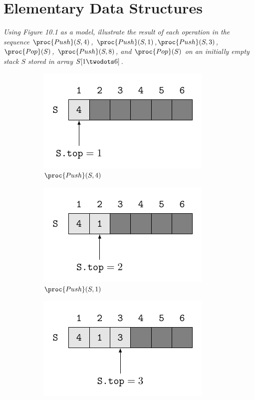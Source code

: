 \section{Elementary Data Structures}

\begin{description}

 \textit{Using Figure 10.1 as a model, illustrate the result of each operation in the sequence $\proc{Push}(S,4)$, $\proc{Push}(S,1)$,$\proc{Push}(S,3)$, $\proc{Pop}(S)$, $\proc{Push}(S,8)$, and $\proc{Pop}(S)$  on an initially empty stack $S$ stored in array $S[1 \twodots6]$.}
\begin{ex}
    \begin{figure}[H]
      \centering
      \begin{subfigure}[t]{.45\textwidth}
        \centering
        \includegraphics[scale=1]{img/10_1-1/10_1-1_1.pdf}
        \caption{$\proc{Push}(S,4)$}\label{fig:10_1-1_1}
      \end{subfigure}
      \begin{subfigure}[t]{.45\textwidth}
        \centering
        \includegraphics[scale=1]{img/10_1-1/10_1-1_2.pdf}
        \caption{$\proc{Push}(S,1)$}\label{fig:10_1-1_2}
      \end{subfigure}
      \begin{subfigure}[t]{.45\textwidth}
        \centering
        \includegraphics[scale=1]{img/10_1-1/10_1-1_3.pdf}

\end{subfigure}
\end{figure}
\end{ex}
\end{description}
